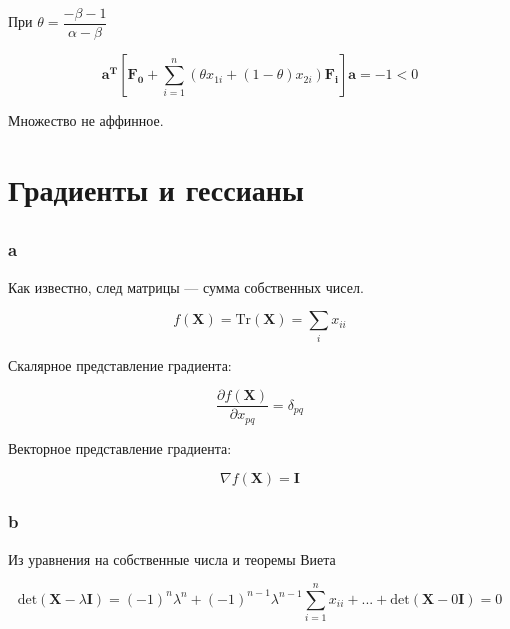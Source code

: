 	При $\theta = \dfrac{-\beta - 1}{\alpha - \beta}$
	
	\begin{equation}
	\mathbf{a^T} \left[ \mathbf{F_0} + \sum\limits_{i=1}^{n}(\theta x_{1i} + (1-\theta) x_{2i} )\mathbf{F_i} \right] \mathbf{a} = -1 < 0
	\end{equation}
	
	Множество не аффинное.
	
	\section{Градиенты и гессианы}
	
	\subsection{}
	
	\subsubsection{a}
	
	Как известно, след матрицы --- сумма собственных чисел.
	
	\begin{equation}
	f(\mathbf{X}) = \text{Tr} (\mathbf{X}) = \sum_i x_{ii}
	\end{equation}
	
	Скалярное представление градиента:
	
	\begin{equation}
	\frac{\partial f(\mathbf{X}) }{\partial x_{pq}}  = \delta_{pq} 
	\end{equation}
	
	Векторное представление градиента:
	
	\begin{equation}
	\nabla f(\mathbf{X}) = \mathbf{I}
	\end{equation}
	
	\subsubsection{b}
	
	Из уравнения на собственные числа и теоремы Виета
	
	\begin{equation}
	\text{det}(\mathbf{X} - \lambda \mathbf{I}) = (-1)^n \lambda^n +(-1)^{n-1} \lambda^{n-1} \sum\limits_{i=1}^{n}x_{ii} + ... + \text{det} (\mathbf{X} - 0 \mathbf{I} )= 0
	\end{equation}
	
